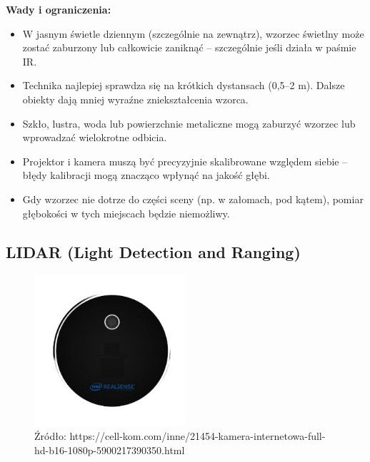 \documentclass[magisterska]{pracadypl}
\begin{document}
\begin{minipage}[t]{\textwidth}
\textbf{Wady i ograniczenia:}
\begin{itemize}
  \item W jasnym świetle dziennym (szczególnie na zewnątrz), wzorzec świetlny może zostać zaburzony lub całkowicie zaniknąć – szczególnie jeśli działa w paśmie IR.

  \item Technika najlepiej sprawdza się na krótkich dystansach (0,5–2 m). Dalsze obiekty dają mniej wyraźne zniekształcenia wzorca.

  \item Szkło, lustra, woda lub powierzchnie metaliczne mogą zaburzyć wzorzec lub wprowadzać wielokrotne odbicia.

  \item Projektor i kamera muszą być precyzyjnie skalibrowane względem siebie – błędy kalibracji mogą znacząco wpłynąć na jakość głębi.

  \item Gdy wzorzec nie dotrze do części sceny (np. w załomach, pod kątem), pomiar głębokości w tych miejscach będzie niemożliwy.
\end{itemize}
\end{minipage}

\subsection{LIDAR (Light Detection and Ranging)}

\begin{figure}[h]  %
    \centering  %
    \includegraphics[width=0.5\textwidth]{images/LIDAR.png}  %
    \captionsetup{labelformat=empty, font=footnotesize}
    \caption{Źródło: https://cell-kom.com/inne/21454-kamera-internetowa-full-hd-b16-1080p-5900217390350.html}
    \label{fig:mono}  %
\end{figure}
\end{document}
